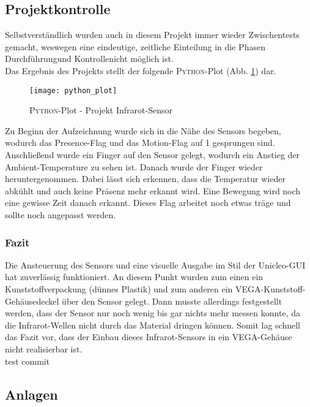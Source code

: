 \documentclass[
	letterpaper, %
	10pt, %
]{CSUniSchoolLabReport}
\begin{document}
\begin{spacing}{1.6}
\subsection{Projektkontrolle}
Selbstverständlich wurden auch in diesem Projekt immer wieder Zwischentests gemacht, weswegen eine eindeutige, zeitliche Einteilung in die Phasen \glqq Durchführung\grqq und \glqq Kontrolle\grqq nicht möglich ist.\\
Das Ergebnis des Projekts stellt der folgende \textsc{Python}-Plot (Abb. \ref{fig:python_plot}) dar.
\begin{figure}[H]
    \centering
    \texttt{[image: python\_plot]}
    \caption{\textsc{Python}-Plot - Projekt \glqq Infrarot-Sensor\grqq}
    \label{fig:python_plot}
\end{figure}
Zu Beginn der Aufzeichnung wurde sich in die Nähe des Sensors begeben, wodurch das Presence-Flag und das Motion-Flag auf 1 gesprungen sind. Anschließend wurde ein Finger auf den Sensor gelegt, wodurch ein Anstieg der Ambient-Temperature zu sehen ist. Danach wurde der Finger wieder heruntergenommen. Dabei lässt sich erkennen, dass die Temperatur wieder abkühlt und auch keine Präsenz mehr erkannt wird. Eine Bewegung wird noch eine gewisse Zeit danach erkannt. Dieses Flag arbeitet noch etwas träge und sollte noch angepasst werden.\\

\subsubsection{Fazit}
Die Ansteuerung des Sensors und eine visuelle Ausgabe im Stil der Unicleo-GUI hat zuverlässig funktioniert. An diesem Punkt wurden zum einen ein Kunststoffverpackung (dünnes Plastik) und zum anderen ein VEGA-Kunststoff-Gehäusedeckel über den Sensor gelegt. Dann musste allerdings festgestellt werden, dass der Sensor nur noch wenig bis gar nichts mehr messen konnte, da die Infrarot-Wellen nicht durch das Material dringen können. Somit lag schnell das Fazit vor, dass der Einbau dieses Infrarot-Sensors in ein VEGA-Gehäuse nicht realisierbar ist.
\\test commit

\newpage
\listoffigures

\newpage
\listoftables

\newpage
\lstlistoflistings

\newpage
\begin{landscape}
    \section{Anlagen}

\end{landscape}
\end{spacing}
\end{document}
